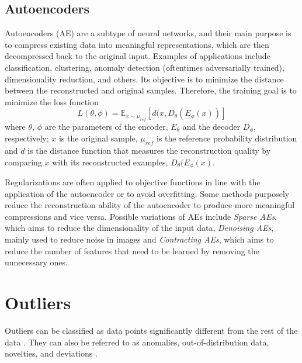 \subsection{Autoencoders}
Autoencoders (AE) are a subtype of neural networks, and their main purpose is to compress existing data into meaningful representations, which are then decompressed back to the original input. Examples of applications include classification, clustering, anomaly detection (oftentimes adversarially trained), dimensionality reduction, and others. Its objective is to minimize the distance between the reconstructed and original samples. Therefore, the training goal is to minimize the loss function  
\begin{equation}
    L(\theta, \phi) = \mathbb{E}_{x\sim\mu_{ref}}[d(x, D_{\theta}(E_{\phi}(x))]
    \label{eq:ae_objective_func}
\end{equation} where $\theta$, $\phi$ are the parameters of the encoder, $E_\theta$ and the decoder $D_\phi$, respectively; $x$ is the original sample, $\mu_{ref}$ is the reference probability distribution and $d$ is the distance function that measures the reconstruction quality by comparing $x$ with its reconstructed examples, $D_{\theta}(E_{\phi}(x)$.

Regularizations are often applied to objective functions in line with the application of the autoencoder or to avoid overfitting. Some methods purposely reduce the reconstruction ability of the autoencoder to produce more meaningful compressions and vice versa. Possible variations of AEs include \textit{Sparse AEs}, which aims to reduce the dimensionality of the input data, \textit{Denoising AEs}, mainly used to reduce noise in images and \textit{Contracting AEs}, which aims to reduce the number of features that need to be learned by removing the unnecessary ones. %



\section{Outliers}
Outliers can be classified as data points significantly different from the rest of the data \cite{aggarwal_OutlierAnalysis_2013}. They can also be referred to as anomalies, out-of-distribution data, novelties, and deviations \cite{aggarwal_OutlierAnalysis_2013, xia.etal_GANbasedAnomalyDetection_2022}.

